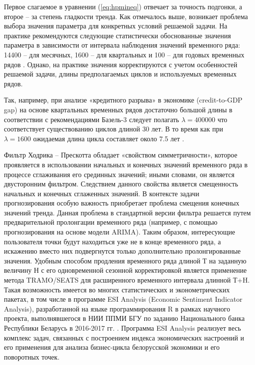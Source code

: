 \documentclass[a4paper,14pt]{extreport}
\begin{document}
	Первое слагаемое в уравнении (\ref{eq:hpmineq}) отвечает за точность подгонки, а второе -- за степень гладкости тренда. Как отмечалось выше, возникает проблема выбора значения параметра   для конкретных условий решаемой задачи. На практике рекомендуются следующие статистически обоснованные значения параметра   в зависимости от интервала наблюдения значений временного ряда: 14400 -- для месячных, 1600 -- для квартальных и 100 -- для годовых временных рядов \cite{hp_orig_paper}. Однако, на практике значения   корректируются с учетом особенностей решаемой задачи, длины предполагаемых циклов и используемых временных рядов. 
	
	Так, например, при анализе «кредитного разрыва» в экономике (credit-to-GDP gap) на основе квартальных временных рядов достаточно большой длины в соответствии с рекомендациями Базель-3 следует полагать $\lambda = 400000$  что соответствует существованию циклов длиной 30 лет.  В то время как при $\lambda = 1600$ ожидаемая длина цикла составляет около 7.5 лет \cite{schuler_detrend}.
	
	Фильтр Ходрика -- Прескотта обладает «свойством симметричности», которое проявляется в использовании начальных и конечных значений временного ряда в процессе сглаживания его срединных значений; иными словами, он является двусторонним фильтром. Следствием данного свойства является смещенность начальных и конечных сглаженных значений. В контексте задачи прогнозирования особую важность приобретает проблема смещения конечных значений тренда. Данная проблема в стандартной версии фильтра решается путем предварительной пролонгации временного ряда (например, с помощью прогнозирования на основе модели ARIMA). Таким образом, интересующие пользователя точки будут находиться уже не в конце временного ряда, а искажению вместо них подвергнутся только дополнительно пролонгированные значения.
	Удобным способом продления временного ряда длиной Т на заданную величину Н с его одновременной сезонной корректировкой является применение метода TRAMO/SEATS для расширенного временного интервала длинной Т+H. Такая возможность имеется во многих статистических и эконометрических пакетах, в том числе в программе ESI Analysis (Economic Sentiment Indicator Analysis), разработанной на языке программирования R в рамках научного проекта, выполнявшегося в НИИ ППМИ БГУ по заданию Национального банка Республики Беларусь в 2016-2017 гг. \cite{esiMaking}. Программа ESI Analysis реализует весь комплекс задач, связанных с построением индекса экономических настроений и его применения для анализа бизнес-цикла белорусской экономики и его поворотных точек.  
	
\end{document}
